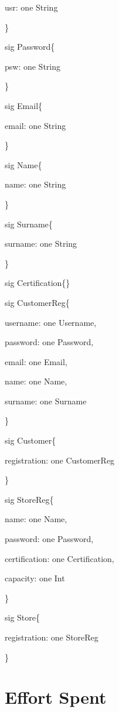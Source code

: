 \documentclass{article}
\begin{document}
		usr: one String
		
	\}
	
	
	sig Password\{
		
		psw: one String
		
	\}


	sig Email\{
	
		email: one String
		
	\}
	
	sig Name\{
	
		name: one String
		
	\}
	
	sig Surname\{
	
		surname: one String
		
	\}

	sig Certification\{\}
	
	sig CustomerReg\{
	
		username: one Username,
		
		password: one Password,
		
		email: one Email,
		
		name: one Name,
		
		surname: one Surname
		
	\}

	sig Customer\{
	
		registration: one CustomerReg
		
	\}

	sig StoreReg\{
	
		name: one Name,
		
		password: one Password,
		
		certification: one Certification,
		
		capacity: one Int		
		
	\}
	
	sig Store\{
	
		registration: one StoreReg
		
	\}
	
	
	
	
\section{Effort Spent}

	\bigskip
	\bigskip
	
\end{document}
